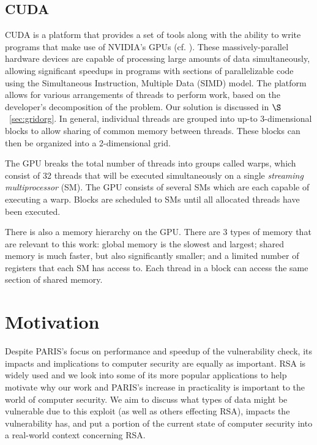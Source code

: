\documentclass[smallextended]{svjour3}       %
\begin{document}
\subsection{CUDA}
\label{subsec:cuda}
CUDA is a platform that provides a set of tools along with the ability to 
write programs that make use of NVIDIA's GPUs (cf. 
\cite{nvidia2012programming}). These massively-parallel hardware devices are 
capable of processing large amounts of data simultaneously, allowing 
significant speedups in programs with sections of parallelizable code using 
the Simultaneous Instruction, Multiple Data (SIMD) model. The platform allows
for various arrangements of threads to perform work, based on the developer's
decomposition of the problem. Our solution is discussed in
$\S$~\ref{sec:gridorg}. In general, individual threads are grouped into up-to
3-dimensional blocks to allow sharing of common memory between threads. These
blocks can then be organized into a 2-dimensional grid.  

The GPU breaks the total number of threads into groups called warps, which 
consist of 32 threads that will be executed simultaneously on a single
\textit{streaming multiprocessor} (SM). The GPU consists of several SMs which 
are each capable of executing a warp. Blocks are scheduled to SMs until all 
allocated threads have been executed. 

There is also a memory hierarchy on the GPU. There are 3 types of memory 
that are relevant to this work: global memory is the slowest and 
largest; shared memory is much faster, but also significantly smaller; and 
a limited number of registers that each SM has access to. Each thread in a
block can access the same section of shared memory.


\section{Motivation}
\label{sec:motivation}
Despite PARIS's focus on performance and speedup of the vulnerability check,
its impacts and implications to computer security are equally as important.
RSA is widely used and we look into some of its more popular applications to
help motivate why our work and PARIS's increase in practicality is important to
the world of computer security. We aim to discuss what types of data might be
vulnerable due to this exploit (as well as others effecting RSA), impacts the
vulnerability has, and put a portion of the current state of computer security
into a real-world context concerning RSA.
\end{document}
